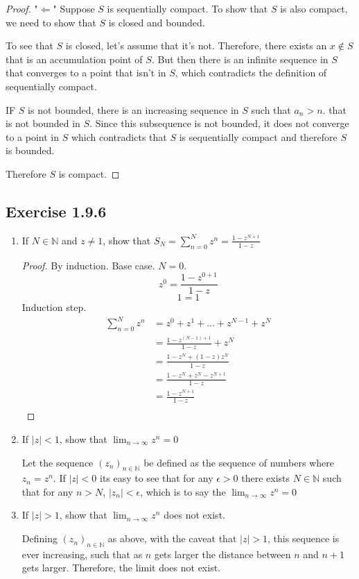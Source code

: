 \documentclass{tufte-book}
\theoremstyle{mytheoremstyle}
\theoremstyle{mylemstyle}
\theoremstyle{mydefstyle}
\begin{document}
\begin{proof}"$\Leftarrow$"
Suppose $S$ is sequentially compact. To show that $S$ is also compact, we need to show that $S$ is closed and bounded.

To see that $S$ is closed, let's assume that it's not.  Therefore, there exists an $x \notin S$ that is an accumulation point of $S$.  But then there is an infinite sequence in $S$ that converges to a point that isn't in $S$, which contradicts the definition of sequentially compact.

IF $S$ is not bounded, there is an increasing sequence in $S$ such that $a_n > n$.  that is not bounded in $S$.  Since this subsequence is not bounded, it does not converge to a point in $S$ which contradicts that $S$ is sequentially compact and therefore $S$ is bounded.

Therefore $S$ is compact.
\end{proof}

\subsection{Exercise 1.9.6}
\begin{enumerate}

\item If $N \in \mathbb{N}$ and $z \neq 1$, show that $S_N = \sum_{n=0}^{N}z^n = \frac{1-z^{N+1}}{1-z}$

\begin{proof}By induction.
Base case. $N=0$.
\[z^0 = \frac{1-z^{0+1}}{1-z}\]
\[1 = 1\]
Induction step.
\begin{align*}
\sum_{n=0}^{N}z^n &= z^0+z^1+...+z^{N-1} + z^{N}\\
 &= \frac{1-z^{(N-1)+1}}{1-z} + z^{N}\\
 &= \frac{1-z^{N} + (1-z)z^{N}}{1-z}\\
 &= \frac{1-z^{N} + z^{N} - z^{N+1}}{1-z}\\
 &= \frac{1-z^{N+1}}{1-z}\\
\end{align*}
\end{proof}

\item If $|z| < 1$, show that $\lim_{n \rightarrow \infty}z^n =0$

Let the sequence $(z_n)_{n \in \mathbb{N}}$ be defined as the sequence of numbers where $z_n = z^n$.  If $|z| < 0$ its easy to see that for any $\epsilon > 0$ there exists $N \in \mathbb{N}$ such that for any $n > N$, $|z_n| < \epsilon$, which is to say the $\lim_{n \rightarrow \infty}z^n =0$

\item If $|z| > 1$, show that $\lim_{n \rightarrow \infty}z^n$ does not exist.

Defining $(z_n)_{n \in \mathbb{N}}$ as above, with the caveat that $|z| > 1$, this sequence is ever increasing, such that as $n$ gets larger the distance between $n$ and $n+1$ gets larger.  Therefore, the limit does not exist.

\end{enumerate}
\end{document}
